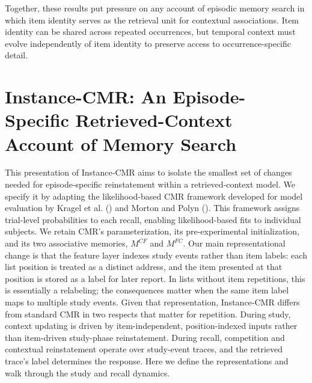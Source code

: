 \documentclass[
  man,
  floatsintext,
  longtable,
  nolmodern,
  notxfonts,
  notimes,
  draftfirst,
  colorlinks=true,linkcolor=blue,citecolor=blue,urlcolor=blue]{apa7}
\begin{document}
Together, these results put pressure on any account of episodic memory
search in which item identity serves as the retrieval unit for
contextual associations. Item identity can be shared across repeated
occurrences, but temporal context must evolve independently of item
identity to preserve access to occurrence-specific detail.

\section{Instance-CMR: An Episode-Specific Retrieved-Context Account of
Memory
Search}\label{instance-cmr-an-episode-specific-retrieved-context-account-of-memory-search}

This presentation of Instance‑CMR aims to isolate the smallest set of
changes needed for episode‑specific reinstatement within a
retrieved‑context model. We specify it by adapting the likelihood-based
CMR framework developed for model evaluation by Kragel et al.
() and Morton and Polyn
(). This framework assigns
trial-level probabilities to each recall, enabling likelihood-based fits
to individual subjects. We retain CMR's parameterization, its
pre-experimental initialization, and its two associative memories,
\(M^{CF}\) and \(M^{FC}\). Our main representational change is that the
feature layer indexes study events rather than item labels: each list
position is treated as a distinct address, and the item presented at
that position is stored as a label for later report. In lists without
item repetitions, this is essentially a relabeling; the consequences
matter when the same item label maps to multiple study events. Given
that representation, Instance‑CMR differs from standard CMR in two
respects that matter for repetition. During study, context updating is
driven by item-independent, position-indexed inputs rather than
item-driven study-phase reinstatement. During recall, competition and
contextual reinstatement operate over study-event traces, and the
retrieved trace's label determines the response. Here we define the
representations and walk through the study and recall dynamics.
\end{document}
